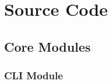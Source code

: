 \documentclass[12pt,a4paper]{report}
\begin{document}



\appendix

\chapter{Source Code}

\section{Core Modules}

\subsection{CLI Module}
\end{document}
